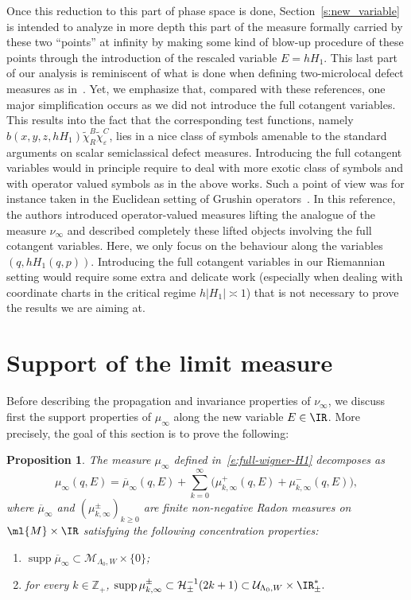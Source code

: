 \documentclass[10pt]{amsart}
\theoremstyle{plain}
\newtheorem{prop}[theo]{Proposition}
\theoremstyle{definition}
\theoremstyle{remark}
\begin{document}
Once this reduction to this part of phase space is done, Section~\ref{s:new_variable} is intended to analyze in more depth this part of the measure formally carried by these two ``points'' at infinity by making some kind of blow-up procedure of these points through the introduction of the rescaled variable $E=hH_1$. This last part of our analysis is reminiscent of what is done when defining two-microlocal defect measures as in~\cite{Fermanian95, Miller96, Nier96, Fermanian00, AnantharamanMacia14}. Yet, we emphasize that, compared with these references, one major simplification occurs as we did not introduce the full cotangent variables. This results into the fact that the corresponding test functions, namely $b(x,y,z,hH_1)\tilde{\chi}_R^B\tilde{\chi}_\varepsilon^C$, lies in a nice class of symbols amenable to the standard arguments on scalar semiclassical defect measures. Introducing the full cotangent variables would in principle require to deal with more exotic class of symbols and with operator valued symbols as in the above works. Such a point of view was for instance taken in the Euclidean setting of Grushin operators~\cite{ArnaizSun22}. In this reference, the authors introduced operator-valued measures lifting the analogue of the measure $\nu_\infty$ and \hbox{described} completely these lifted objects involving the full cotangent variables. Here, we only focus on the behaviour along the variables $(q,hH_1(q,p))$. Introducing the full cotangent variables in our Riemannian setting would require some extra and delicate work (especially when dealing with coordinate charts in the critical regime $h|H_1|\asymp 1$) that is not necessary to prove the results we are aiming at.

\section{Support of the limit measure}\label{s:support}

Before describing the propagation and invariance properties of $\nu_\infty$, we discuss first the support properties of $\mu_\infty$ along the new variable $E\in \IR$. More precisely, the goal of this section is to prove the following:

\begin{prop}
\label{p:support_properties}
The measure $\mu_\infty$ defined in~\eqref{e:full-wigner-H1} decomposes as
\[
\mu_\infty(q,E) = \overline{\mu}_\infty(q,E) + \sum_{k=0}^\infty \big(\mu_{k,\infty}^+(q,E) + \mu_{k,\infty}^-(q,E) \big),
\]
where $\overline{\mu}_\infty$ and $(\mu_{k,\infty}^\pm)_{k\geq 0}$ are finite non-negative Radon measures on $\ml{M}\times\IR$ satisfying the
following concentration properties:
\begin{enumerate}\renewcommand{\theenumi}{S.\arabic{enumi}}
\item $\operatorname{supp} \overline{\mu}_\infty \subset \mathcal{M}_{\Lambda_0,W} \times \{ 0 \}$;

\item for every $k \in \mathbb{Z}_+$, $ \operatorname{supp} \mu_{k,\infty}^\pm \subset \mathcal{H}_\pm^{-1}(2k+1) \subset \mathcal{U}_{\Lambda_0,W}\times\IR_{\pm}^*.$
\end{enumerate}
\end{prop}
\end{document}
